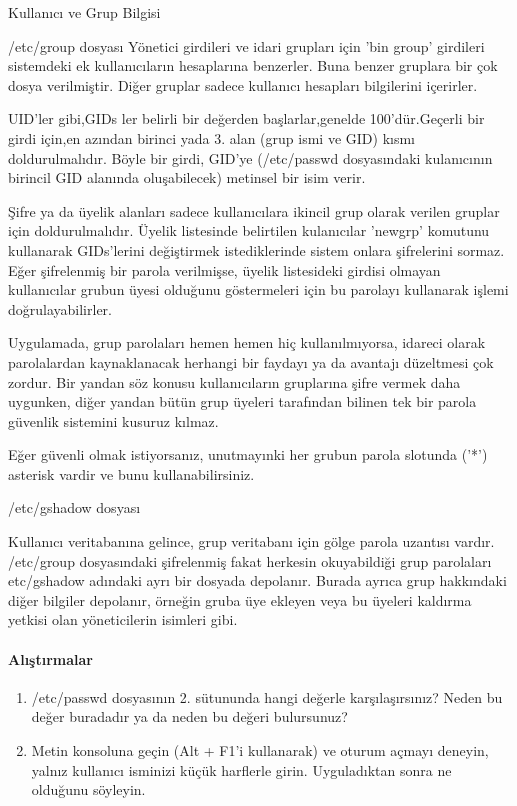 \begin{section}{Kullanıcı ve Grup Bilgisi}
\begin{subsection}{/etc/group dosyası}
Yönetici girdileri ve idari grupları için 'bin group' girdileri sistemdeki ek kullanıcıların hesaplarına benzerler. Buna benzer gruplara bir çok dosya verilmiştir. Diğer gruplar sadece kullanıcı hesapları bilgilerini içerirler.

UID'ler gibi,GIDs ler belirli bir değerden başlarlar,genelde 100'dür.Geçerli bir girdi için,en azından birinci yada 3. alan (grup ismi ve GID) kısmı doldurulmalıdır. Böyle bir girdi, GID'ye (/etc/passwd dosyasındaki kulanıcının birincil GID alanında oluşabilecek) metinsel bir isim verir.

Şifre ya da üyelik alanları sadece kullanıcılara ikincil grup olarak verilen gruplar için doldurulmalıdır. Üyelik listesinde belirtilen kulanıcılar 'newgrp' komutunu kullanarak GIDs'lerini değiştirmek istediklerinde sistem onlara şifrelerini sormaz. Eğer şifrelenmiş bir parola verilmişse, üyelik listesideki girdisi olmayan kullanıcılar grubun üyesi olduğunu göstermeleri için bu parolayı kullanarak işlemi doğrulayabilirler.

Uygulamada, grup parolaları hemen hemen hiç kullanılmıyorsa, idareci olarak parolalardan kaynaklanacak herhangi bir faydayı ya da avantajı düzeltmesi çok zordur. Bir yandan söz konusu kullanıcıların gruplarına şifre vermek daha uygunken, diğer yandan bütün grup üyeleri tarafından bilinen tek bir parola güvenlik sistemini kusuruz kılmaz.

Eğer güvenli olmak istiyorsanız, unutmayınki her grubun parola slotunda ('*') asterisk vardir ve bunu kullanabilirsiniz.
\end{subsection}
\begin{subsection}{/etc/gshadow dosyası}

Kullanıcı veritabanına gelince, grup veritabanı için gölge parola uzantısı vardır. /etc/group dosyasındaki şifrelenmiş fakat herkesin okuyabildiği grup parolaları etc/gshadow adındaki ayrı bir dosyada depolanır. Burada ayrıca grup hakkındaki diğer bilgiler depolanır, örneğin gruba üye ekleyen veya bu üyeleri kaldırma yetkisi olan yöneticilerin isimleri gibi.
\end{subsection}
\paragraph{{\Huge{\PencilLeftDown}}Alıştırmalar}{
\begin{enumerate}
\item /etc/passwd dosyasının 2. sütununda hangi değerle karşılaşırsınız? Neden bu değer buradadır ya da neden bu değeri bulursunuz?
\item Metin konsoluna geçin (Alt + F1'i kullanarak) ve oturum açmayı deneyin, yalnız kullanıcı isminizi küçük harflerle girin. Uyguladıktan sonra ne olduğunu söyleyin.
\end{enumerate}
}
\end{section}
